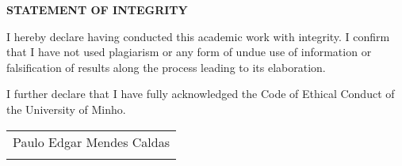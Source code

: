 \begin{center}
    \textbf{STATEMENT OF INTEGRITY}
\end{center}

    I hereby declare having conducted this academic work with integrity. I confirm that I have not used plagiarism or any form of undue use of information or falsification of results along the process leading to its elaboration.
        
    I further declare that I have fully acknowledged the Code of Ethical Conduct of the University of Minho.
        
\begin{flushright}
\begin{tabular}{@{}p{2.2in}}
Paulo Edgar Mendes Caldas\\
\medskip
\hrulefill \\
\end{tabular}
\end{flushright}
